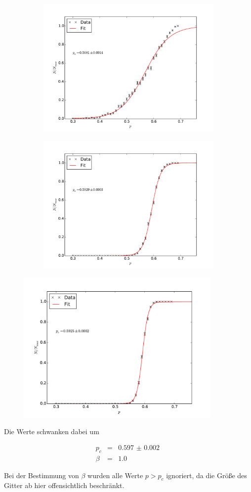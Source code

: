 \documentclass{scrartcl}
\begin{document}
\begin{figure}[H]
    \centering
    \begin{subfigure}{.48\textwidth}
        \centering
        \includegraphics[width=\textwidth]{plots/p10.pdf}
    \end{subfigure}
    \begin{subfigure}{.48\textwidth}
        \centering
        \includegraphics[width=\textwidth]{plots/p50.pdf}
    \end{subfigure}
    \includegraphics[width=10cm]{plots/p100.pdf}
\end{figure}

Die Werte schwanken dabei um

\begin{eqnarray*}
    p_c & = & \SI{0.597(2)}{} \\
    \beta & = & \SI{1.0}{}
\end{eqnarray*}

Bei der Bestimmung von $\beta$ wurden alle Werte $p > p_c$ ignoriert,
da die Größe des Gitter ab hier offensichtlich beschränkt. 
\end{document}

